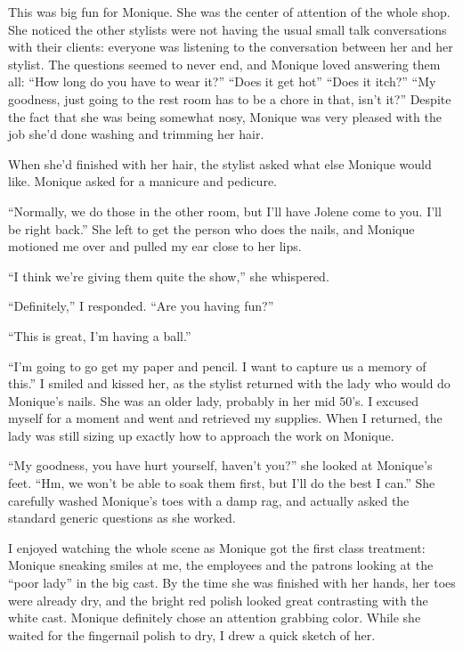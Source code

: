 \begin{thought}
This was big fun for Monique. She was the center of attention of the whole shop. She
noticed the other stylists were not having the usual small talk conversations with their
clients: everyone was listening to the conversation between her and her stylist. The questions
seemed to never end, and Monique loved answering them all: ``How long do you have to wear it?''
``Does it get hot'' ``Does it itch?'' ``My goodness, just going to the rest room has to be a
chore in
that, isn't it?'' Despite the fact that she was being somewhat nosy, Monique was very pleased
with the job she'd done washing and trimming her hair.
\end{thought}

When she'd finished with her hair, the stylist asked what else Monique would like. Monique
asked for a manicure and pedicure.

``Normally, we do those in the other room, but I'll have Jolene come to you. I'll be right
back.'' She left to get the person who does the nails, and Monique motioned me over and pulled
my
ear close to her lips.

``I think we're giving them quite the show,'' she whispered.

``Definitely,'' I responded. ``Are you having fun?''

``This is great, I'm having a ball.''

``I'm going to go get my paper and pencil. I want to capture us a memory of this.'' I smiled
and kissed her, as the stylist returned with the lady who would do Monique's nails. She was an
older lady, probably in her mid 50's. I excused myself for a moment and went and retrieved my
supplies. When I returned, the lady was still sizing up exactly how to approach the work on
Monique.

``My goodness, you have hurt yourself, haven't you?'' she looked at Monique's feet. ``Hm, we
won't be able to soak them first, but I'll do the best I can.'' She carefully washed Monique's
toes with a damp rag, and actually asked the standard generic questions as she worked.

I enjoyed watching the whole scene as Monique got the first class treatment: Monique
sneaking smiles at me, the employees and the patrons looking at the ``poor lady'' in the big
cast.
By the time she was finished with her hands, her toes were already dry, and the bright red
polish looked great contrasting with the white cast. Monique definitely chose an attention
grabbing color. While she waited for the fingernail polish to dry, I drew a quick sketch of her.

